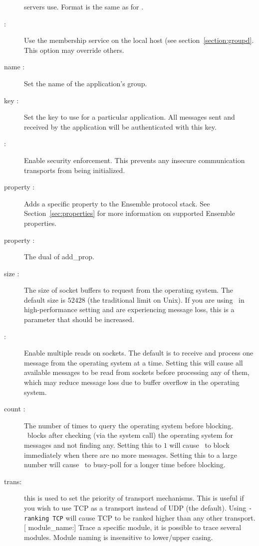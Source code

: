 \begin{description}
 servers use.  Format is the same as for .
\item
[\mlval{-groupd} :] Use the membership service on the local host (see
section~\ref{section:groupd}.  This option may override others.
\item
[\mlval{-group\_name} name :] Set the name of the application's group.
\item
[\mlval{-key} key :] Set the key to use for a particular application.  All
messages sent and received by the application will be authenticated with this
key.
\item
[\mlval{-secure} :] Enable security enforcement.  This prevents any insecure
communication transports from being initialized.
\item
[\mlval{-add\_prop} property :] Adds a specific property to the
Ensemble protocol stack. See Section~\ref{sec:properties} for more
information on supported Ensemble properties. 
\item 
[\mlval{-remove\_prop} property :] The dual of add\_prop.
\item 
[\mlval{-sock\_buf} size :] The size of socket buffers to request
from the operating system.  The default size is $52428$ (the
traditional limit on Unix).  If you are using \ensemble\ in
high-performance setting and are experiencing message loss, this is a
parameter that should be increased.
\item
[\mlval{-multiread} :] Enable multiple reads on sockets.  The default
is to receive and process one message from the operating system
at a time.  Setting this will cause all available messages to be read
from sockets before processing any of them, which may reduce message
loss due to buffer overflow in the operating system.
\item
[\mlval{-pollcount} count :] The number of times to query the
operating system before blocking.  \ensemble\ blocks after checking
(via the  system call) the operating system for
messages and not finding any.  Setting this to $1$ will cause
\ensemble\ to block immediately when there are no more messages.
Setting this to a large number will cause \ensemble\ to busy-poll for
a longer time before blocking.
\item
[\mlval{-ranking} trans:] this is used to set the priority of
transport mechanisms. This is useful if you wish to use TCP as a
transport instead of UDP (the default). Using {\tt -ranking TCP} will
cause TCP to be ranked higher than any other transport. 
[ module\_name:] Trace a specific module, it is possible
to trace several modules. Module naming is insensitive to lower/upper casing.
\end{description}

